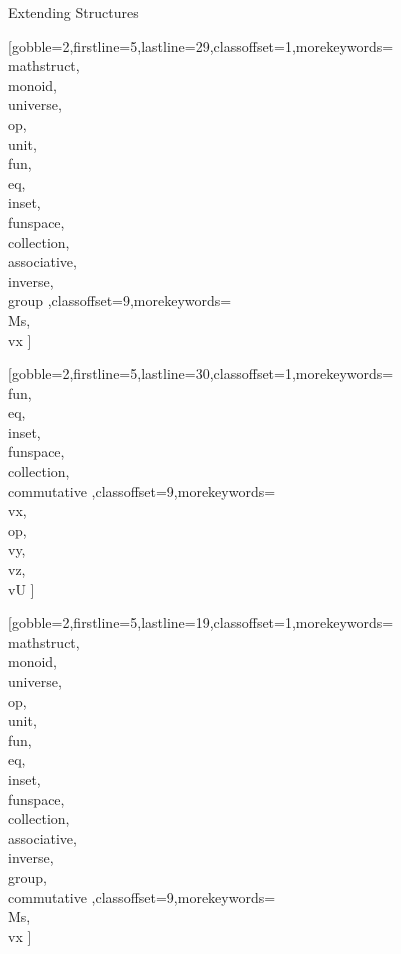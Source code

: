 \documentclass[lang={en,de}]{stex}
\begin{document}
  \begin{sfragment}{Extending Structures}


    [gobble=2,firstline=5,lastline=29,classoffset=1,morekeywords={
    \\mathstruct,\\monoid,\\universe,\\op,\\unit,\\fun,\\eq,\\inset,
    \\funspace,\\collection,\\associative,\\inverse,\\group
    },classoffset=9,morekeywords={
      \\Ms,\\vx
    }]

    [gobble=2,firstline=5,lastline=30,classoffset=1,morekeywords={
    \\fun,\\eq,\\inset,
    \\funspace,\\collection,\\commutative
    },classoffset=9,morekeywords={
      \\vx,\\op,\\vy,\\vz,\\vU
    }]

    [gobble=2,firstline=5,lastline=19,classoffset=1,morekeywords={
    \\mathstruct,\\monoid,\\universe,\\op,\\unit,\\fun,\\eq,\\inset,
    \\funspace,\\collection,\\associative,\\inverse,\\group,
    \\commutative
    },classoffset=9,morekeywords={
      \\Ms,\\vx
    }]


\end{sfragment}
\end{document}
